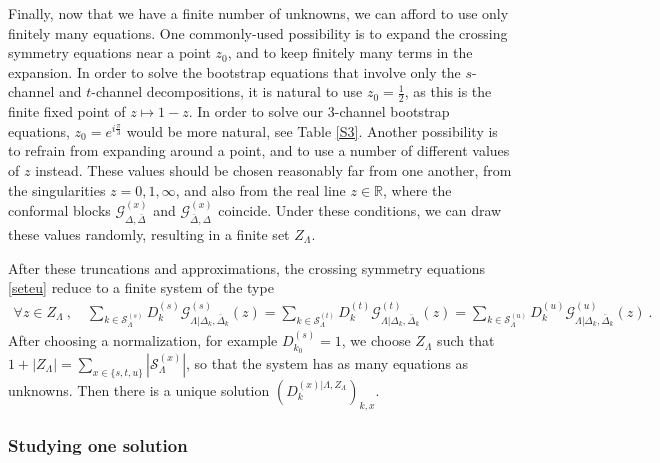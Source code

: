 \documentclass[12pt, a4paper]{article}
\theoremstyle{break}
\begin{document}
Finally, now that we have a finite number of unknowns, we can afford to use only finitely many equations. One commonly-used possibility is to expand the crossing symmetry equations near a point $z_0$, and to keep finitely many terms in the expansion. In order to solve the bootstrap equations that involve only the $s$-channel and $t$-channel decompositions, it is natural to use $z_0=\frac12$, as this is the finite fixed point of $z\mapsto 1-z$. In order to solve our 3-channel bootstrap equations, $z_0 = e^{i\frac{\pi}{3}}$ would be more natural, see Table \eqref{S3}. Another possibility is to refrain from expanding around a point, and to use a number of different values of $z$ instead. These values should be chosen reasonably far from one another, from the singularities $z=0,1,\infty$, and also from the real line $z\in\mathbb{R}$, where the conformal blocks $\mathcal{G}^{(x)}_{\Delta,\bar\Delta}$ and $\mathcal{G}^{(x)}_{\bar\Delta,\Delta}$ coincide. Under these conditions, we can draw these values randomly, resulting in a finite set $Z_\Lambda$.

After these truncations and approximations, the crossing symmetry equations \eqref{seteu} reduce to a finite system of the type 
\begin{align}
 \forall z\in Z_\Lambda\ , \quad 
 \sum_{k\in\mathcal{S}^{(s)}_\Lambda} D_k^{(s)} \mathcal{G}^{(s)}_{\Lambda|\Delta_k,\bar\Delta_k}(z) 
 = \sum_{k\in\mathcal{S}^{(t)}_\Lambda} D_k^{(t)} \mathcal{G}^{(t)}_{\Lambda|\Delta_k,\bar\Delta_k}(z) 
 = \sum_{k\in\mathcal{S}^{(u)}_\Lambda} D_k^{(u)} \mathcal{G}^{(u)}_{\Lambda|\Delta_k,\bar\Delta_k}(z)\ .
 \label{fziz}
\end{align}
After choosing a normalization, for example $D_{k_0}^{(s)}=1$, we choose $Z_\Lambda$ such that $1+|Z_\Lambda|=\sum_{x\in\{s,t,u\}}\left|\mathcal{S}^{(x)}_\Lambda\right|$, so that the system has as many equations as unknowns. Then there is a unique solution $\left(D_k^{(x)|\Lambda,Z_\Lambda}\right)_{k,x}$.

\subsubsection{Studying one solution}\label{sec:sos}
\end{document}
